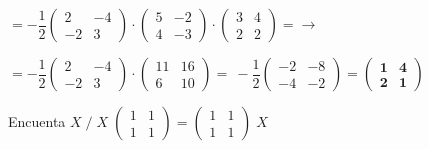 \begin{proofw}
   $=-\dfrac 1 2   \left( \begin{matrix}  
   2&-4\\-2&3 \end{matrix} \right)\cdot
   \left( \begin{matrix}  5&-2\\4&-3  \end{matrix} \right)
   \cdot 
    \left( \begin{matrix}  
   3&4 \\ 2&2 \end{matrix} \right) = \to$
   
   $=-\dfrac 1 2   \left( \begin{matrix}  
   2&-4\\-2&3 \end{matrix} \right)\cdot
    \left( \begin{matrix}  11&16\\6&10  \end{matrix} \right)=\
    -\dfrac 1 2  \left( \begin{matrix}  -2&-8\\-4&-2  \end{matrix} \right)=
  \boldsymbol{\left( \begin{matrix}  1&4\\2&1  \end{matrix} \right)}$
	
	\end{proofw}

\begin{ejre}
 Encuenta $X \; / \; X\;\left( \begin{matrix} 1&1\\1&1 \end{matrix} \right)=\left( \begin{matrix}  1&1\\1&1  \end{matrix} \right)\;X$
\end{ejre}

